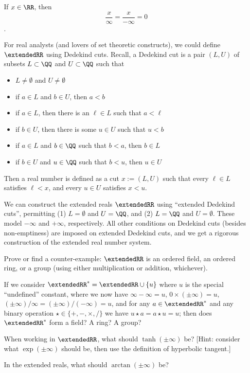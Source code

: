 \begin{axiom}[Division]
  If $x\in\RR$, then
  $$\frac{x}{\infty}=\frac{x}{-\infty}=0$$.
\end{axiom}

\begin{rmk}
For real analysts (and lovers of set theoretic constructs), we could
define $\extendedRR$ using Dedekind cuts. Recall, a Dedekind cut is a
pair $(L,U)$ of subsets $L\subset\QQ$ and $U\subset\QQ$ such that
\begin{itemize}
\item $L\neq\emptyset$ and $U\neq\emptyset$
\item if $a\in L$ and $b\in U$, then $a<b$
\item if $a\in L$, then there is an $\ell\in L$ such that $a < \ell$
\item if $b\in U$, then there is some $u\in U$ such that $u < b$
\item if $a\in L$ and $b\in\QQ$ such that $b < a$, then $b\in L$
\item if $b\in U$ and $u\in\QQ$ such that $b < u$, then $u\in U$
\end{itemize}
Then a real number is defined as a cut $x := (L,U)$ such that every
$\ell\in L$ satisfies $\ell < x$, and every $u\in U$ satisfies $x < u$.

We can construct the extended reals $\extendedRR$ using ``extended
Dedekind cuts'', permitting (1) $L=\emptyset$ and $U=\QQ$, and (2)
$L=\QQ$ and $U=\emptyset$. These model $-\infty$ and $+\infty$,
respectively. All other conditions on Dedekind cuts (besides
non-emptiness) are imposed on extended Dedekind cuts, and we get a
rigorous construction of the extended real number system.
\end{rmk}


\begin{xca}
  Prove or find a counter-example: $\extendedRR$ is an ordered field, an
  ordered ring, or a group (using either multiplication or addition, whichever).
\end{xca}


\begin{xca}
  If we consider $\extendedRR^{*}=\extendedRR\cup\{u\}$ where $u$ is the
  special ``undefined'' constant, where we now have $\infty-\infty=u$,
  $0\times(\pm\infty)=u$, $(\pm\infty)/\infty=(\pm\infty)/(-\infty)=u$,
  and for any $a\in\extendedRR^{*}$ and any binary operation
  $\star\in\{+,-,\times,/\}$ we have $u\star a = a\star u = u$;
  then does $\extendedRR^{*}$ form a field? A ring? A group?
\end{xca}


\begin{xca}
  When working in $\extendedRR$, what should $\tanh(\pm\infty)$ be?
  [Hint: consider what $\exp(\pm\infty)$ should be, then use the
    definition of hyperbolic tangent.]
\end{xca}


\begin{xca}
  In the extended reals, what should $\arctan(\pm\infty)$ be?
\end{xca}
